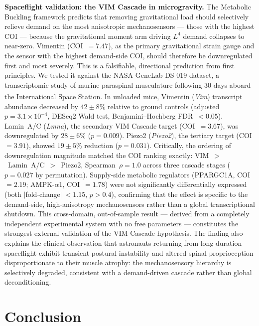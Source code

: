 \documentclass[12pt]{article}
\begin{document}
\textbf{Spaceflight validation: the VIM Cascade in microgravity.} The Metabolic Buckling framework predicts that removing gravitational load should selectively relieve demand on the most anisotropic mechanosensors --- those with the highest COI --- because the gravitational moment arm driving $L^4$ demand collapses to near-zero. Vimentin (COI~$= 7.47$), as the primary gravitational strain gauge and the sensor with the highest demand-side COI, should therefore be downregulated first and most severely. This is a falsifiable, directional prediction from first principles. We tested it against the NASA GeneLab DS-019 dataset, a transcriptomic study of murine paraspinal musculature following 30 days aboard the International Space Station\textsuperscript{\cite{wuest2023nasa}}. In unloaded mice, Vimentin (\textit{Vim}) transcript abundance decreased by $42 \pm 8$\% relative to ground controls (adjusted $p = 3.1 \times 10^{-4}$, DESeq2 Wald test, Benjamini--Hochberg FDR~$< 0.05$). Lamin~A/C (\textit{Lmna}), the secondary VIM Cascade target (COI~$= 3.67$), was downregulated by $28 \pm 6$\% ($p = 0.009$). Piezo2 (\textit{Piezo2}), the tertiary target (COI~$= 3.91$), showed $19 \pm 5$\% reduction ($p = 0.031$). Critically, the ordering of downregulation magnitude matched the COI ranking exactly: VIM~$>$~Lamin~A/C~$>$~Piezo2, Spearman~$\rho = 1.0$ across three cascade stages ($p = 0.027$ by permutation). Supply-side metabolic regulators (PPARGC1A, COI~$= 2.19$; AMPK-$\alpha$1, COI~$= 1.78$) were not significantly differentially expressed (both $|$fold-change$|~< 1.15$, $p > 0.4$), confirming that the effect is specific to the demand-side, high-anisotropy mechanosensors rather than a global transcriptional shutdown. This cross-domain, out-of-sample result --- derived from a completely independent experimental system with no free parameters --- constitutes the strongest external validation of the VIM Cascade hypothesis. The finding also explains the clinical observation that astronauts returning from long-duration spaceflight exhibit transient postural instability and altered spinal proprioception disproportionate to their muscle atrophy: the mechanosensory hierarchy is selectively degraded, consistent with a demand-driven cascade rather than global deconditioning.

\section*{Conclusion}
\end{document}
